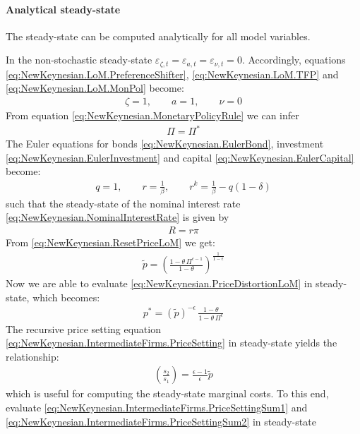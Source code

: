 \paragraph{Analytical steady-state} The steady-state can be computed analytically for all model variables.

In the non-stochastic steady-state $\varepsilon_{\zeta,t}=\varepsilon_{a,t}=\varepsilon_{\nu,t}=0$.
Accordingly, equations \eqref{eq:NewKeynesian.LoM.PreferenceShifter}, \eqref{eq:NewKeynesian.LoM.TFP} and \eqref{eq:NewKeynesian.LoM.MonPol} become:
\begin{align*}
\zeta = 1, \qquad a=1, \qquad \nu = 0
\end{align*}
From equation \eqref{eq:NewKeynesian.MonetaryPolicyRule} we can infer
\begin{align*}
\Pi = \Pi^*
\end{align*}
The Euler equations for bonds \eqref{eq:NewKeynesian.EulerBond}, investment \eqref{eq:NewKeynesian.EulerInvestment} and capital \eqref{eq:NewKeynesian.EulerCapital} become:
\begin{align*}
q = 1, \qquad r=\frac{1}{\beta}, \qquad r^k = \frac{1}{\beta} - q(1-\delta)
\end{align*}
such that the steady-state of the nominal interest rate \eqref{eq:NewKeynesian.NominalInterestRate} is given by
\begin{align*}
R = r \pi
\end{align*}
From \eqref{eq:NewKeynesian.ResetPriceLoM} we get:
\begin{align*}
{\widetilde{p}} = \left(\frac{1-{{\theta}}\, {{\Pi}}^{{{\epsilon}}-1}}{1-{{\theta}}}\right)^{\frac{1}{1-{{\epsilon}}}}
\end{align*}
Now we are able to evaluate \eqref{eq:NewKeynesian.PriceDistortionLoM} in steady-state, which becomes:
\begin{align*}
{p^*} = ({{\widetilde{p}}})^{-{{\epsilon}}} \,\frac{1-{{\theta}}}{1-{{\theta}}\, {{\Pi}}^{{{\epsilon}}}}
\end{align*}
The recursive price setting equation \eqref{eq:NewKeynesian.IntermediateFirms.PriceSetting} in steady-state yields the relationship:
\begin{align*}
\left(\frac{s_2}{s_1}\right) = \frac{\epsilon-1}{\epsilon} \widetilde{p}
\end{align*}
which is useful for computing the steady-state marginal costs.
To this end, evaluate \eqref{eq:NewKeynesian.IntermediateFirms.PriceSettingSum1} and \eqref{eq:NewKeynesian.IntermediateFirms.PriceSettingSum2} in steady-state
